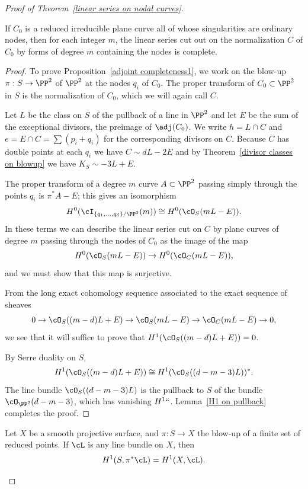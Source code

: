 \begin{proof}[Proof of Theorem~\ref{linear series on nodal curves}]
\begin{proposition}\label{adjoint completeness1}
If $C_{0}$ is a reduced irreducible plane curve all of whose singularities
are ordinary nodes, then for each
integer $m$,
the linear series cut out on the normalization $C$ of $C_{0}$ by forms
of degree $m$ containing the nodes
is complete.
\end{proposition}

\begin{proof}
To prove Proposition~\ref{adjoint completeness1}, we work on the blow-up
$\pi : S \to \PP^2$ of $\PP^2$ at the nodes $q_i$ of $C_0$. The proper
transform of $C_0 \subset \PP^2$ in $S$ is the normalization of $C_0$,
%
which we will again call $C$.

Let $L$ be the class on $S$ of the pullback of a line in $\PP^2$
and let $E$ be the sum of the exceptional divisors, the preimage of
$\adj(C_{0})$. We write $h= L\cap C$ and $e = E\cap C= \sum (p_i+q_i)$
for the corresponding divisors on $C$.
Because $C$ has double points at each $q_{i}$ we have
$
C \sim dL - 2E
$
and   by
Theorem~\ref{divisor classes on blowup} we have $K_S \sim -3L + E$.

The proper transform of a degree $m$ curve $A\subset \PP^2$  passing
simply through the points $q_i$
is $\pi^*A - E$; this gives an isomorphism
$$
H^0(\cI_{\{q_1,\dots,q_\delta\}/\PP^2}(m)) \cong H^0(\cO_S(mL-E)).
$$
In these terms we can describe the linear series cut on $C$ by plane
curves of degree $m$ passing through the nodes of $C_0$ as the image of
the map
$$
H^0(\cO_S(mL-E)) \to H^0(\cO_C(mL-E)),
$$
and we must show that this map is surjective.

From the long exact cohomology sequence associated to the exact sequence
of sheaves
$$
0 \to \cO_S((m-d)L + E)  \to \cO_S(mL-E) \to \cO_C(mL-E) \to 0,
$$
 we see that it will suffice to prove that $H^1(\cO_S((m-d)L + E)) = 0$.

By Serre duality on $S$,
$$
H^1(\cO_S((m-d)L + E)) \cong H^1(\cO_S((d-m-3)L))^*.
$$
The line bundle $\cO_S((d-m-3)L)$ is
 the pullback to $S$ of the bundle $\cO_{\PP^2}(d-m-3)$, which has
 vanishing $H^1` `$. Lemma~\ref{H1 on pullback} completes the proof.
\end{proof}

\begin{lemma}\label{H1 on pullback}
Let $X$ be a smooth projective surface, and $\pi : S \to X$ the
%
blow-up of
a finite set of reduced points. If $\cL$ is any line bundle on $X$, then
$$
H^1(S, \pi^*\cL) = H^1(X, \cL).
$$
\end{lemma}


\end{proof}
